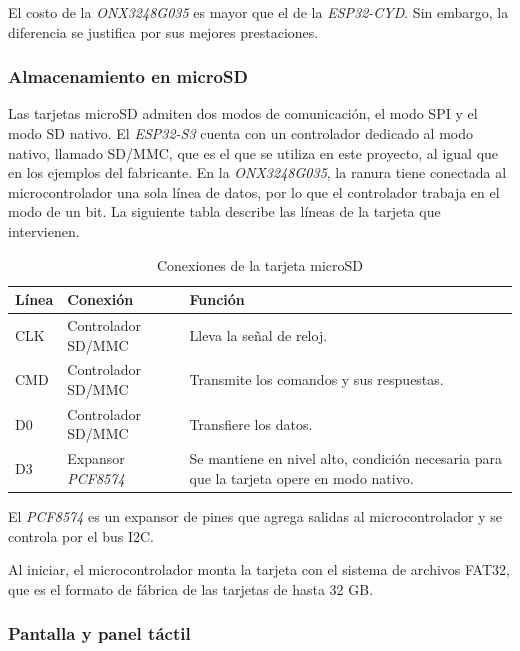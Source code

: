 El costo de la \emph{ONX3248G035} es mayor que el de la \emph{ESP32-CYD}. Sin embargo, la diferencia se justifica por sus mejores prestaciones.

\subsubsection{Almacenamiento en microSD}

Las tarjetas microSD admiten dos modos de comunicación, el modo SPI y el modo SD nativo. El \emph{ESP32-S3} cuenta con un controlador dedicado al modo nativo, llamado SD/MMC, que es el que se utiliza en este proyecto, al igual que en los ejemplos del fabricante. En la \emph{ONX3248G035}, la ranura tiene conectada al microcontrolador una sola línea de datos, por lo que el controlador trabaja en el modo de un bit. La siguiente tabla describe las líneas de la tarjeta que intervienen.

\begin{table}[H]
    \centering
    \caption{Conexiones de la tarjeta microSD}
    \label{tab:lineas_microsd}
    \begin{tabularx}{\textwidth}{|l|l|>{\raggedright\arraybackslash}X|}
        \hline
        \textbf{Línea} & \textbf{Conexión} & \textbf{Función} \\
        \hline
        CLK & Controlador SD/MMC & Lleva la señal de reloj. \\
        \hline
        CMD & Controlador SD/MMC & Transmite los comandos y sus respuestas. \\
        \hline
        D0 & Controlador SD/MMC & Transfiere los datos. \\
        \hline
        D3 & Expansor \emph{PCF8574} & Se mantiene en nivel alto, condición necesaria para que la tarjeta opere en modo nativo. \\
        \hline
    \end{tabularx}
\end{table}

El \emph{PCF8574} es un expansor de pines que agrega salidas al microcontrolador y se controla por el bus I2C.

Al iniciar, el microcontrolador monta la tarjeta con el sistema de archivos FAT32, que es el formato de fábrica de las tarjetas de hasta 32 GB.

\subsubsection{Pantalla y panel táctil}

